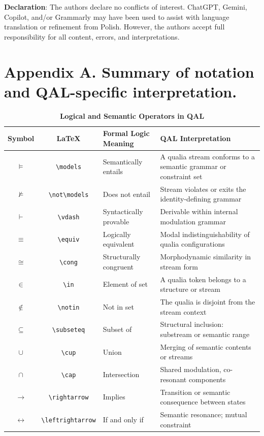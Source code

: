 \documentclass[11pt]{article}
\numberwithin{equation}{section} %
\begin{document}
\vspace{1em}
\textbf{Declaration}: The authors declare no conflicts of interest. ChatGPT, Gemini, Copilot, and/or Grammarly may have been used to assist with language translation or refinement from Polish. However, the authors accept full responsibility for all content, errors, and interpretations.

\section{Appendix A. Summary of notation and QAL-specific interpretation.}
\begin{table}[H]
\centering
\renewcommand{\arraystretch}{1.25}
\begin{tabularx}{\textwidth}{|c|c|X|X|}
\hline
\textbf{Symbol} & \textbf{LaTeX} & \textbf{Formal Logic Meaning} & \textbf{QAL Interpretation} \\
\hline
$\models$ & \texttt{\textbackslash models} & Semantically entails & A qualia stream conforms to a semantic grammar or constraint set \\
\hline
$\not\models$ & \texttt{\textbackslash not\textbackslash models} & Does not entail & Stream violates or exits the identity-defining grammar \\
\hline
$\vdash$ & \texttt{\textbackslash vdash} & Syntactically provable & Derivable within internal modulation grammar \\
\hline
$\equiv$ & \texttt{\textbackslash equiv} & Logically equivalent & Modal indistinguishability of qualia configurations \\
\hline
$\cong$ & \texttt{\textbackslash cong} & Structurally congruent & Morphodynamic similarity in stream form \\
\hline
$\in$ & \texttt{\textbackslash in} & Element of set & A qualia token belongs to a structure or stream \\
\hline
$\notin$ & \texttt{\textbackslash notin} & Not in set & The qualia is disjoint from the stream context \\
\hline
$\subseteq$ & \texttt{\textbackslash subseteq} & Subset of & Structural inclusion: substream or semantic range \\
\hline
$\cup$ & \texttt{\textbackslash cup} & Union & Merging of semantic contents or streams \\
\hline
$\cap$ & \texttt{\textbackslash cap} & Intersection & Shared modulation, co-resonant components \\
\hline
$\rightarrow$ & \texttt{\textbackslash rightarrow} & Implies & Transition or semantic consequence between states \\
\hline
$\leftrightarrow$ & \texttt{\textbackslash leftrightarrow} & If and only if & Semantic resonance; mutual constraint \\
\hline
\end{tabularx}
\caption{\textbf{Logical and Semantic Operators in QAL}}
\end{table}
\end{document}
